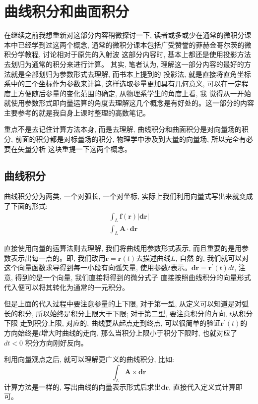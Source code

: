 \section{曲线积分和曲面积分}
在继续之前我想重新对这部分内容稍微探讨一下, 读者或多或少在通常的微积分课本中已经学到过这两个概念, 通常的微积分课本包括广受赞誉的菲赫金哥尔茨的微积分学教程, 讨论相对于原先的入射波
这部分内容时, 基本上都还是使用投影方法去划归为通常的积分来进行计算。 其实, 笔者认为, 理解这一部分内容的最好的方法就是全部划归为参数形式去理解, 而书本上提到的
投影法, 就是直接将直角坐标系中的三个坐标作为参数来计算, 这样选取参量更加具有几何意义, 可以在一定程度上方便随后参量的变化范围的确定, 从物理系学生的角度上看, 我
觉得从一开始就使用参数形式即向量运算的角度去理解这几个概念是有好处的。这一部分的内容主要参考的就是我自身上课时整理的高数笔记。

重点不是去记住计算方法本身, 而是去理解, 曲线积分和曲面积分是对向量场的积分, 前面的积分都是对标量场的积分, 物理学中涉及到大量的向量场, 所以完全有必要在矢量分析
这块重提一下这两个概念。
\subsection*{曲线积分}
曲线积分分为两类, 一个对弧长, 一个对坐标, 实际上我们利用向量式写出来就变成了下面的形式:
\begin{align}
    \int_L \bm{f(\bm{r})}|\bm{dr}|\tag{a}\\
    \int_L \bm{A}\cdot\bm{dr}\tag{b}
\end{align}

直接使用向量的运算法则去理解, 我们将曲线用参数形式表示, 而且重要的是用参数表示出每一点的。即, 我们改用$\bm{r}=\bm{r}(t)$去描述曲线$L$, 自然
的, 我们就可以对这个向量函数求导得到每一小段有向弧矢量, 使用参数$t$表示。$\bm{dr}=\bm{r}^\prime(t)dt$, 注意, 得到的是一个向量, 我们直接将得到的微分式子
直接按照曲线积分的向量形式代入便可以将其转化为通常的一元积分。

但是上面的代入过程中要注意参量的上下限, 对于第一型, 从定义可以知道是对弧长的积分, 所以始终是积分上限大于下限; 对于第二型, 要注意积分的方向, $t$从积分下限
走到积分上限, 对应的, 曲线要从起点走到终点, 可以很简单的验证$\bm{r}^\prime(t)$的方向始终是$t$增大时曲线的走向, 那么当积分上限小于积分下限时, 也就对应了$dt<0$
积分方向刚好反向。

利用向量观点之后, 就可以理解更广义的曲线积分, 比如:
\begin{equation}
    \int_L \bm{A}\times\bm{dr}\tag{c}
\end{equation}
计算方法是一样的, 写出曲线的向量表示形式后求出$\bm{dr}$, 直接代入定义式计算即可。
